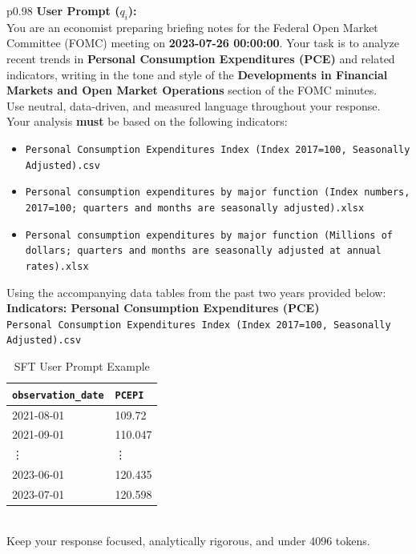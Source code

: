 \begin{table}[h]
    \centering
    \footnotesize
    \begin{tabular}{p{}}
    \toprule
    \textbf{User Prompt ($q_i$):} \\
    \midrule
    You are an economist preparing briefing notes for the Federal Open Market Committee (FOMC) meeting on \textbf{2023-07-26 00:00:00}. Your task is to analyze recent trends in \textbf{Personal Consumption Expenditures (PCE)} and related indicators, writing in the tone and style of the \textbf{Developments in Financial Markets and Open Market Operations} section of the FOMC minutes. \\
    
    Use neutral, data-driven, and measured language throughout your response. \\
    
    Your analysis \textbf{must} be based on the following indicators: 
    \begin{itemize}
        \item \texttt{Personal Consumption Expenditures Index (Index 2017=100, Seasonally Adjusted).csv}
        \item \texttt{Personal consumption expenditures by major function (Index numbers, 2017=100; quarters and months are seasonally adjusted).xlsx}
        \item \texttt{Personal consumption expenditures by major function (Millions of dollars; quarters and months are seasonally adjusted at annual rates).xlsx}
    \end{itemize}

    Using the accompanying data tables from the past two years provided below: \\

    \vspace{0.5em}
    \textbf{Indicators: Personal Consumption Expenditures (PCE)} \\
    \texttt{Personal Consumption Expenditures Index (Index 2017=100, Seasonally Adjusted).csv} \\
    
    \begin{tabular}{|l|l|}
    \hline
    \texttt{observation\_date} & \texttt{PCEPI} \\
    \hline
    2021-08-01 & 109.72 \\
    2021-09-01 & 110.047 \\
    \vdots & \vdots \\
    2023-06-01 & 120.435 \\
    2023-07-01 & 120.598 \\
    \hline
    \end{tabular} \\

    \vspace{0.5em}
    Keep your response focused, analytically rigorous, and under 4096 tokens. \\
    \bottomrule
    \end{tabular}
    \caption{SFT User Prompt Example}
    \label{tab:ch2:sft_user_prompt_example}
\end{table}



